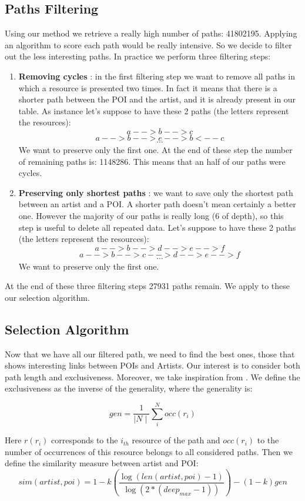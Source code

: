 \documentclass[paper=a4, fontsize=11pt]{scrartcl}
\begin{document}
\subsection{Paths Filtering}
Using our method we retrieve a really high number of paths: 41802195. Applying an algorithm to score each path would be really intensive. So we decide to filter out the less interesting paths.
In practice we perform three filtering steps:
\begin{enumerate}
\item \textbf{Removing cycles} : in the  first filtering step we want to remove all paths in which a resource is presented two times. In fact it means that there is a shorter path between the POI and the artist, and it is already present in our table. As instance let's suppose to have these 2 paths (the letters represent the resources):
$$a-->b-->c$$
$$a-->b-->e-->b<--c$$
$$\cdots$$
We want to preserve only the first one. At the end of these step the number of remaining paths is: 1148286. This means that an half of our paths were cycles.

\item \textbf{Preserving only shortest paths} :  we want to save only the shortest path between an artist and a POI. A shorter path doesn't mean certainly a better one. However the majority of our paths is really long (6 of depth), so this step is useful to delete all repeated data. Let's suppose to have these 2 paths (the letters represent the resources):
$$a-->b-->d-->e-->f$$
$$a-->b-->c-->d-->e-->f$$
$$\cdots$$
We want to preserve only the first one.

\end{enumerate}

At the end of these three filtering steps 27931 paths remain. We apply to these our selection algorithm.

\subsection{Selection Algorithm}
Now that we have all our filtered path, we need to find the best ones, those that shows interesting links between POIs and Artists. Our interest is to consider both path length and exclusiveness.
Moreover, we take inspiration from \cite{meng2013review}.
We define the exclusiveness as the inverse of the generality, where the generality is:

$$gen =\frac{1}{\mid N \mid}\sum_i^Nocc(r_{i})$$

Here $r(r_{i})$ corresponds to the $i_{th}$ resource of the path and $occ(r_{i})$ to the number of occurrences of this resource belongs to all considered paths.
Then we define the similarity measure between artist and POI:
$$sim(artist,poi) = 1-k(\frac{\log(len(artist,poi)-1)}{\log(2*(deep_{max} -1))})-(1-k)gen$$
\end{document}
